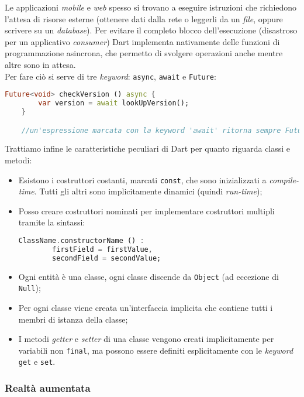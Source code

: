Le applicazioni \textit{mobile} e \textit{web} spesso si trovano a eseguire istruzioni che richiedono l'attesa di risorse esterne (ottenere dati dalla rete o leggerli da un \textit{file}, oppure scrivere su un \textit{database}). Per evitare il completo blocco dell'esecuzione (disastroso per un applicativo \textit{consumer}) Dart implementa nativamente delle funzioni di programmazione asincrona, che permetto di svolgere operazioni anche mentre altre sono in attesa.\\
Per fare ciò si serve di tre \textit{keyword}: \verb+async+, \verb+await+ e \verb+Future+:
\begin{lstlisting}[language=dart, firstnumber=1,caption={Dart operatori '?' e '!'}]
    Future<void> checkVersion () async {
        var version = await lookUpVersion();
    }

    //un'espressione marcata con la keyword 'await' ritorna sempre Future<T>
\end{lstlisting}

Trattiamo infine le caratteristiche peculiari di Dart per quanto riguarda classi e metodi:
\begin{itemize}
    \item Esistono i costruttori costanti, marcati \verb+const+, che sono inizializzati a \textit{compile-time}. Tutti gli altri sono implicitamente dinamici (quindi \textit{run-time});
    \item Posso creare costruttori nominati per implementare costruttori multipli tramite la sintassi:
\begin{lstlisting}[language=dart]
    ClassName.constructorName () :
        firstField = firstValue,
        secondField = secondValue;
\end{lstlisting}
    \item Ogni entità è una classe, ogni classe discende da \verb+Object+ (ad eccezione di \verb+Null+);
    \item Per ogni classe viene creata un'interfaccia implicita che contiene tutti i membri di istanza della classe;
    \item I metodi \textit{getter} e \textit{setter} di una classe vengono creati implicitamente per variabili non \verb+final+, ma possono essere definiti esplicitamente con le \textit{keyword} \verb+get+ e \verb+set+.
\end{itemize}

\subsubsection{Realtà aumentata}
